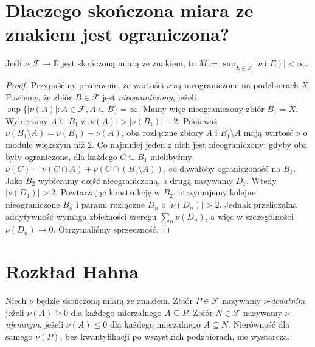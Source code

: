 \section{Dlaczego skończona miara ze znakiem jest ograniczona?}
\begin{lemat}
\label{lem:bounded-signed-16}
Jeśli $\nu:\mathcal F\to\mathbb R$ jest skończoną
miarą ze znakiem, to $M:=\sup_{E\in\mathcal F}|\nu(E)|<\infty$.
\end{lemat}
\begin{proof}
Przypuśćmy przeciwnie, że wartości $\nu$ są nieograniczone
na podzbiorach $X$. Powiemy, że zbiór $B\in\mathcal F$
jest \emph{nieograniczony}, jeżeli
$\sup\{|\nu(A)|:A\in\mathcal F,A\subseteq B\}=\infty$.
Mamy więc nieograniczony zbiór $B_1=X$.
Wybieramy $A\subseteq B_1$ z
$|\nu(A)|>|\nu(B_1)|+2$. Ponieważ
$\nu(B_1\setminus A)=\nu(B_1)-\nu(A)$,
oba rozłączne zbiory $A$ i $B_1\setminus A$ mają
wartość $\nu$ o module większym niż $2$.
Co najmniej jeden z nich jest nieograniczony: gdyby oba
były ograniczone, dla każdego $C\subseteq B_1$ mielibyśmy
$\nu(C)=\nu(C\cap A)+\nu(C\cap(B_1\setminus A))$,
co dawałoby ograniczoność na $B_1$.
Jako $B_2$ wybieramy część nieograniczoną, a drugą
nazywamy $D_1$. Wtedy $|\nu(D_1)|>2$.
Powtarzając konstrukcję w $B_2$, otrzymujemy kolejne
nieograniczone $B_n$ i parami rozłączne $D_n$
o $|\nu(D_n)|>2$. Jednak przeliczalna addytywność
wymaga zbieżności szeregu $\sum_n\nu(D_n)$,
a więc w szczególności $\nu(D_n)\to0$.
Otrzymaliśmy sprzeczność.
\end{proof}

\section{Rozkład Hahna}
\begin{definicja}
\label{def:positive-negative-16}
Niech $\nu$ będzie skończoną miarą ze znakiem.
Zbiór $P\in\mathcal F$ nazywamy $\nu$-\emph{dodatnim},
jeżeli $\nu(A)\ge0$ dla każdego mierzalnego $A\subseteq P$.
Zbiór $N\in\mathcal F$ nazywamy $\nu$-\emph{ujemnym},
jeżeli $\nu(A)\le0$ dla każdego mierzalnego $A\subseteq N$.
Nierówność dla samego $\nu(P)$, bez kwantyfikacji po
wszystkich podzbiorach, nie wystarcza.
\end{definicja}

